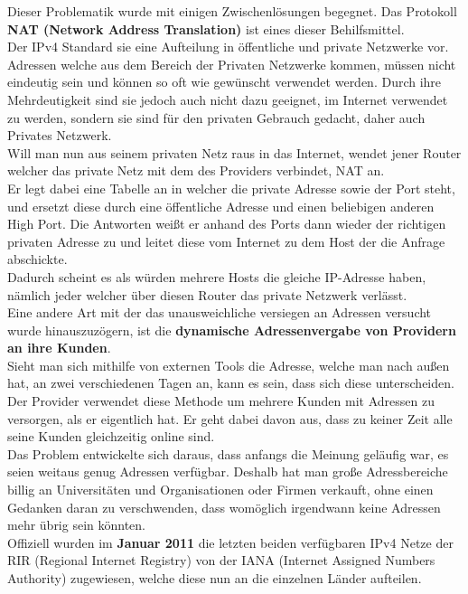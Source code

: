 \documentclass[12pt,a4paper]{report}
\begin{document}
Dieser Problematik wurde mit einigen Zwischenlösungen begegnet. Das Protokoll \textbf{NAT (Network Address Translation)} ist eines dieser Behilfsmittel.\\
Der IPv4 Standard sie eine Aufteilung in öffentliche und private Netzwerke vor. Adressen welche aus dem Bereich der Privaten Netzwerke kommen, müssen nicht eindeutig sein und können so oft wie gewünscht verwendet werden. Durch ihre Mehrdeutigkeit sind sie jedoch auch nicht dazu geeignet, im Internet verwendet zu werden, sondern sie sind für den privaten Gebrauch gedacht, daher auch Privates Netzwerk.\\
Will man nun aus seinem privaten Netz raus in das Internet, wendet jener Router welcher das private Netz mit dem des Providers verbindet, NAT an.\\
Er legt dabei eine Tabelle an in welcher die private Adresse sowie der Port steht, und ersetzt diese durch eine öffentliche Adresse und einen beliebigen anderen High Port. Die Antworten weißt er anhand des Ports dann wieder der richtigen privaten Adresse zu und leitet diese vom Internet zu dem Host der die Anfrage abschickte.\\
Dadurch scheint es als würden mehrere Hosts die gleiche IP-Adresse haben, nämlich jeder welcher über diesen Router das private Netzwerk verlässt.\\

Eine andere Art mit der das unausweichliche versiegen an Adressen versucht wurde hinauszuzögern, ist die \textbf{dynamische Adressenvergabe von Providern an ihre Kunden}.\\
Sieht man sich mithilfe von externen Tools die Adresse, welche man nach außen hat, an zwei verschiedenen Tagen an, kann es sein, dass sich diese unterscheiden.\\
Der Provider verwendet diese Methode um mehrere Kunden mit Adressen zu versorgen, als er eigentlich hat. Er geht dabei davon aus, dass zu keiner Zeit alle seine Kunden gleichzeitig online sind.\\

Das Problem entwickelte sich daraus, dass anfangs die Meinung geläufig war, es seien weitaus genug Adressen verfügbar. Deshalb hat man große Adressbereiche billig an Universitäten und Organisationen oder Firmen verkauft, ohne einen Gedanken daran zu verschwenden, dass womöglich irgendwann keine Adressen mehr übrig sein könnten.\\
Offiziell wurden im \textbf{Januar 2011} die letzten beiden verfügbaren IPv4 Netze der RIR (Regional Internet Registry) von der IANA (Internet Assigned Numbers Authority) zugewiesen, welche diese nun an die einzelnen Länder aufteilen.\\
\end{document}
